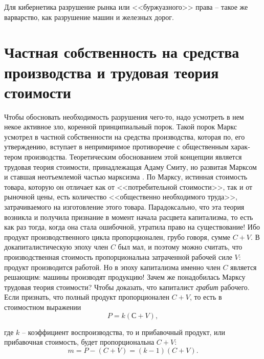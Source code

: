 \documentclass{book}
\begin{document}
Для кибернетика раз­рушение рынка или <<буржуазного>> права -- такое же варварст­во, 
как разрушение машин и железных дорог.



\section{Частная собственность на средства производства и трудовая теория стоимости}

Чтобы обосновать необходимость разрушения чего-то, надо усмотреть в нем некое активное зло, коренной принципиаль­ный порок. Такой порок Маркс усмотрел в частной собствен­ности на средства производства, которая по, его утверждению, вступает в непримиримое противоречие с общественным харак­тером производства. Теоретическим обоснованием этой кон­цепции является трудовая теория стоимости, принадлежащая Адаму Смиту, но развитая Марксом и ставшая неотъемлемой частью марксизма . По Марксу, истинная стоимость товара, которую он отличает как от <<потребительной стоимости>>, так и от рыночной цены, есть количество <<общественно необходи­мого труда>>, затрачиваемого на изготовление этого товара. Парадоксально, что эта теория возникла и получила призна­ние в момент начала расцвета капитализма, то есть как раз тогда, когда она стала ошибочной, утратила право на сущест­вование! Ибо продукт производственного цикла пропорционален, грубо говоря, сумме $C + V$. В докапиталистическую эпоху член $C$ был мал, и поэтому можно 
считать, что произ­водственная стоимость пропорциональна затраченной рабочей силе $V$: продукт производится работой. Но в эпоху капитализ­ма именно член $C$ является решающим: машины производят продукцию! Зачем же понадобилась Марксу трудовая теория стоимости? Чтобы доказать, что капиталист \textit{грабит}  рабочего. Если признать, что полный продукт пропорционален $C + V$, то есть в стоимостном выражении
\[
	P = k(С + V),
\]

где $k$ -- коэффициент воспроизводства, то и прибавочный продукт, или прибавочная стоимость, будет пропорциональ­на $C + V$:
\[
	m=P-(C+V)=(k-1)(C+V).
\]
\end{document}
